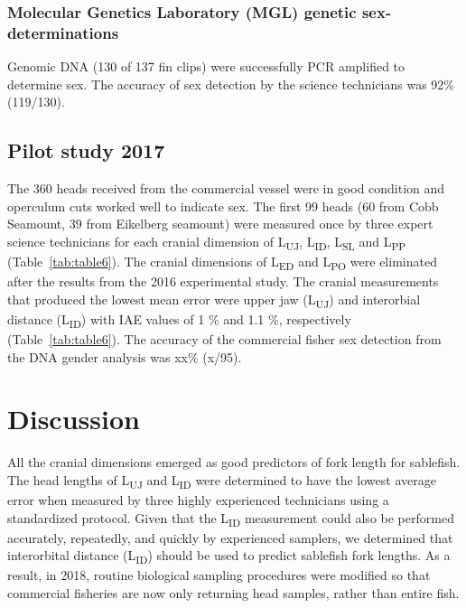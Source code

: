 \documentclass[12pt]{article}\usepackage[]{graphicx}\usepackage[]{color}
\begin{document}
\hypertarget{molecular-genetics-laboratory-mgl-genetic-sex-determinations}{%
\subsubsection{Molecular Genetics Laboratory (MGL) genetic sex-determinations}\label{molecular-genetics-laboratory-mgl-genetic-sex-determinations}}

Genomic DNA (130 of 137 fin clips) were successfully PCR amplified to determine sex. The accuracy of sex detection by the science technicians was 92\% (119/130).

\hypertarget{pilot-study-2017-1}{%
\subsection{Pilot study 2017}\label{pilot-study-2017-1}}

The 360 heads received from the commercial vessel were in good condition and operculum cuts worked well to indicate sex. The first 99 heads (60 from Cobb Seamount, 39 from Eikelberg seamount) were measured once by three expert science technicians for each cranial dimension of L\textsubscript{UJ}, L\textsubscript{ID}, L\textsubscript{SL} and L\textsubscript{PP} (Table~\ref{tab:table6}). The cranial dimensions of L\textsubscript{ED} and L\textsubscript{PO} were eliminated after the results from the 2016 experimental study. The cranial measurements that produced the lowest mean error were upper jaw (L\textsubscript{UJ}) and interorbial distance (L\textsubscript{ID}) with IAE values of 1 \% and 1.1 \%, respectively (Table~\ref{tab:table6}). The accuracy of the commercial fisher sex detection from the DNA gender analysis was xx\% (x/95).

\hypertarget{discussion}{%
\section{Discussion}\label{discussion}}

All the cranial dimensions emerged as good predictors of fork length for sablefish. The head lengths of L\textsubscript{UJ} and L\textsubscript{ID} were determined to have the lowest average error when measured by three highly experienced technicians using a standardized protocol. Given that the L\textsubscript{ID} measurement could also be performed accurately, repeatedly, and quickly by experienced samplers, we determined that interorbital distance (L\textsubscript{ID}) should be used to predict sablefish fork lengths. As a result, in 2018, routine biological sampling procedures were modified so that commercial fisheries are now only returning head samples, rather than entire fish.
\end{document}
